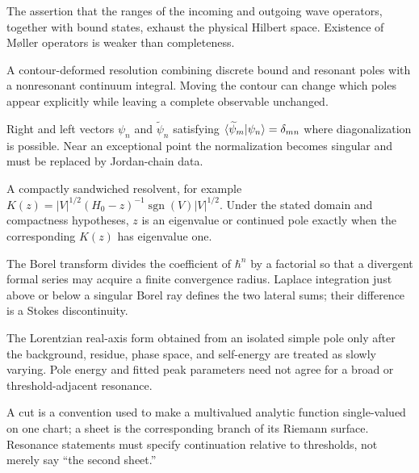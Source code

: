 \begin{description}[style=nextline]
  \item[Asymptotic completeness.]
  The assertion that the ranges of the incoming and outgoing wave operators,
  together with bound states, exhaust the physical Hilbert space.  Existence
  of M{\o}ller operators is weaker than completeness.

  \item[Berggren completeness relation.]
  A contour-deformed resolution combining discrete bound and resonant poles
  with a nonresonant continuum integral.  Moving the contour can change which
  poles appear explicitly while leaving a complete observable unchanged.

  \item[Biorthogonal system.]
  Right and left vectors $\psi_n$ and $\widetilde\psi_n$ satisfying
  $\langle \widetilde\psi_m|\psi_n \rangle=\delta_{mn}$ where diagonalization is
  possible.  Near an exceptional point the normalization becomes singular
  and must be replaced by Jordan-chain data.

  \item[Birman--Schwinger operator.]
  A compactly sandwiched resolvent, for example
  $K(z)=|V|^{1/2}(H_0-z)^{-1}\operatorname{sgn}(V)|V|^{1/2}$.
  Under the stated domain and compactness hypotheses, $z$ is an eigenvalue
  or continued pole exactly when the corresponding $K(z)$ has eigenvalue
  one.

  \item[Borel transform and lateral sum.]
  The Borel transform divides the coefficient of $\hbar^n$ by a factorial so
  that a divergent formal series may acquire a finite convergence radius.
  Laplace integration just above or below a singular Borel ray defines the
  two lateral sums; their difference is a Stokes discontinuity.

  \item[Breit--Wigner approximation.]
  The Lorentzian real-axis form obtained from an isolated simple pole only
  after the background, residue, phase space, and self-energy are treated as
  slowly varying.  Pole energy and fitted peak parameters need not agree for
  a broad or threshold-adjacent resonance.

  \item[Branch cut and sheet.]
  A cut is a convention used to make a multivalued analytic function
  single-valued on one chart; a sheet is the corresponding branch of its
  Riemann surface.  Resonance statements must specify continuation relative
  to thresholds, not merely say ``the second sheet.''


\end{description}
